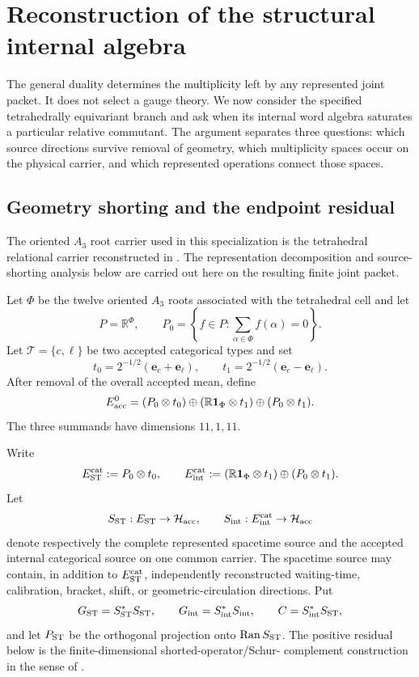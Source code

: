 \documentclass[11pt]{article}
\numberwithin{equation}{section}
\theoremstyle{definition}
\theoremstyle{remark}
\newcommand{\R}{\mathbb R}
\newcommand{\one}{\mathbf 1}
\newcommand{\Ran}{\operatorname{Ran}}
\newcommand{\Hh}{\mathcal H}
\begin{document}
\section{Reconstruction of the structural internal algebra}
\label{sec:internal-algebra}

The general duality determines the multiplicity left by any represented
joint packet.  It does not select a gauge theory.  We now consider the
specified tetrahedrally equivariant branch and ask when its internal word
algebra saturates a particular relative commutant.  The argument separates
three questions: which source directions survive removal of geometry, which
multiplicity spaces occur on the physical carrier, and which represented
operations connect those spaces.


\subsection{Geometry shorting and the endpoint residual}

The oriented $A_3$ root carrier used in this specialization is the tetrahedral
relational carrier reconstructed in \cite{PelissierSpacetime2026}.  The
representation decomposition and source-shorting analysis below are carried
out here on the resulting finite joint packet.

Let $\Phi$ be the twelve oriented $A_3$ roots associated with the tetrahedral
cell and let
\[
P=\R^\Phi,
\qquad
P_0=\left\{f\in P:\sum_{\alpha\in\Phi}f(\alpha)=0\right\}.
\]
Let $\mathscr T=\{c,\ell\}$ be two accepted categorical types and set
\[
t_0=2^{-1/2}(\mathbf e_c+\mathbf e_\ell),
\qquad
t_1=2^{-1/2}(\mathbf e_c-\mathbf e_\ell).
\]
After removal of the overall accepted mean, define
\begin{equation}
E_{\rm acc}^0
=
(P_0\otimes t_0)
\oplus
(\R\one_\Phi\otimes t_1)
\oplus
(P_0\otimes t_1).
\label{eq:accepted-residual}
\end{equation}
The three summands have dimensions $11,1,11$.

Write
\[
E_{\rm ST}^{\rm cat}:=P_0\otimes t_0,
\qquad
E_{\rm int}^{\rm cat}
:=(\R\one_\Phi\otimes t_1)\oplus(P_0\otimes t_1).
\]
Let
\[
S_{\rm ST}:E_{\rm ST}\to\Hh_{\rm acc},
\qquad
S_{\rm int}:E_{\rm int}^{\rm cat}\to\Hh_{\rm acc}
\]
denote respectively the complete represented spacetime source and the accepted
internal categorical source on one common carrier.  The spacetime source may
contain, in addition to $E_{\rm ST}^{\rm cat}$, independently reconstructed
waiting-time, calibration, bracket, shift, or geometric-circulation directions.
Put
\[
G_{\rm ST}=S_{\rm ST}^*S_{\rm ST},
\qquad
G_{\rm int}=S_{\rm int}^*S_{\rm int},
\qquad
C=S_{\rm int}^*S_{\rm ST},
\]
and let $P_{\rm ST}$ be the orthogonal projection onto $\Ran S_{\rm ST}$.
The positive residual below is the finite-dimensional shorted-operator/Schur-
complement construction in the sense of \cite{Anderson1971,AndersonTrapp1975}.
\end{document}
